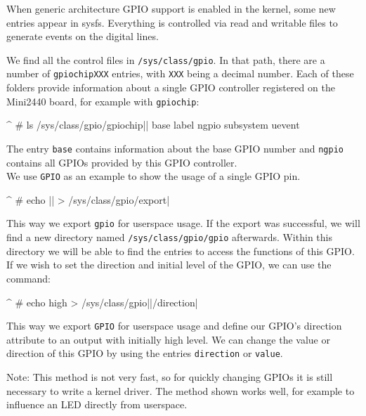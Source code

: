 When generic architecture GPIO support is enabled in the kernel, some new
entries appear in sysfs. Everything is controlled via read and writable
files to generate events on the digital lines.

We find all the control files in \texttt{/sys/class/gpio}. In that path, there are
a number of \texttt{gpiochipXXX} entries, with \texttt{XXX} being a decimal
number. Each of these folders provide information about a single GPIO
controller registered on the Mini2440 board, for example with
\texttt{gpiochip\perGpioChip}:

\begin{ptxshell}[escapechar=|]{^}
# ls /sys/class/gpio/gpiochip|\perGpioChip |
base       label      ngpio      subsystem  uevent
\end{ptxshell}

The entry \texttt{base} contains information about the base GPIO number and
\texttt{ngpio} contains all GPIOs provided by this GPIO controller.\\
We use \texttt{GPIO\perGpioNumber{}} as an example to show the usage of a
single GPIO pin.

\begin{ptxshell}[escapechar=|]{^}
# echo |\ptxshellcmd\perGpioNumber | > /sys/class/gpio/export|
\end{ptxshell}

This way we export \texttt{gpio\perGpioNumber{}} for userspace usage. If the
export was successful, we will find a new directory named
\texttt{/sys/class/gpio/gpio\perGpioNumber{}} afterwards. Within this directory
we will be able to find the entries to access the functions of this GPIO.
If we wish to set the direction and initial level of the GPIO, we can use the
command:

\begin{ptxshell}[escapechar=|]{^}
# echo high > /sys/class/gpio|\perGpioNumber |/direction|
\end{ptxshell}

This way we export \texttt{GPIO\perGpioNumber{}} for userspace usage and define
our GPIO's direction attribute to an output with initially high level. We can
change the value or direction of this GPIO by using the entries
\texttt{direction} or \texttt{value}.

Note: This method is not very fast, so for quickly changing GPIOs it is still
necessary to write a kernel driver. The method shown works well, for example to
influence an LED directly from userspace.

